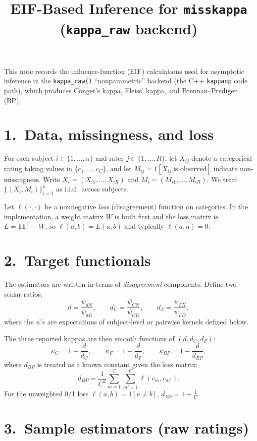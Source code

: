 \documentclass[11pt]{article}
\title{EIF-Based Inference for \texttt{misskappa} (\texttt{kappa\_raw} backend)}
\date{}
\begin{document}
\maketitle

This note records the influence-function (EIF) calculations used for asymptotic
inference in the \texttt{kappa\_raw()} ``nonparametric'' backend (the C++
\texttt{kappanp} code path), which produces Conger's kappa, Fleiss' kappa, and
Brennan--Prediger (BP).

\section*{1.\ Data, missingness, and loss}

For each subject $i\in\{1,\dots,n\}$ and rater $j\in\{1,\dots,R\}$, let $X_{ij}$
denote a categorical rating taking values in $\{c_1,\dots,c_C\}$, and let
$M_{ij} = 1[X_{ij}\ \text{is observed}]$ indicate non-missingness.
Write $X_i = (X_{i1},\dots,X_{iR})$ and $M_i = (M_{i1},\dots,M_{iR})$.
We treat $\{(X_i,M_i)\}_{i=1}^n$ as i.i.d.\ across subjects.

Let $\ell(\cdot,\cdot)$ be a nonnegative \emph{loss} (disagreement) function on
categories. In the implementation, a weight matrix $W$ is built first and the
loss matrix is $L = \mathbf{1}\mathbf{1}^\top - W$, so $\ell(a,b)=L(a,b)$ and
typically $\ell(a,a)=0$.

\section*{2.\ Target functionals}

The estimators are written in terms of \emph{disagreement} components. Define
two scalar ratios:
\[
  d = \frac{\psi_{dN}}{\psi_{dD}},
  \qquad
  d_C = \frac{\psi_{CN}}{\psi_{CD}},
  \qquad
  d_F = \frac{\psi_{FN}}{\psi_{FD}},
\]
where the $\psi$'s are expectations of subject-level or pairwise kernels defined
below.

The three reported kappas are then smooth functions of $(d,d_C,d_F)$:
\[
  \kappa_C = 1 - \frac{d}{d_C},
  \qquad
  \kappa_F = 1 - \frac{d}{d_F},
  \qquad
  \kappa_{BP} = 1 - \frac{d}{d_{BP}},
\]
where $d_{BP}$ is treated as a known constant given the loss matrix:
\[
  d_{BP} = \frac{1}{C^2}\sum_{m=1}^C\sum_{m'=1}^C \ell(c_m,c_{m'}).
\]
For the unweighted 0/1 loss $\ell(a,b)=1[a\neq b]$, $d_{BP}=1-\tfrac1C$.

\section*{3.\ Sample estimators (raw ratings)}
\end{document}
